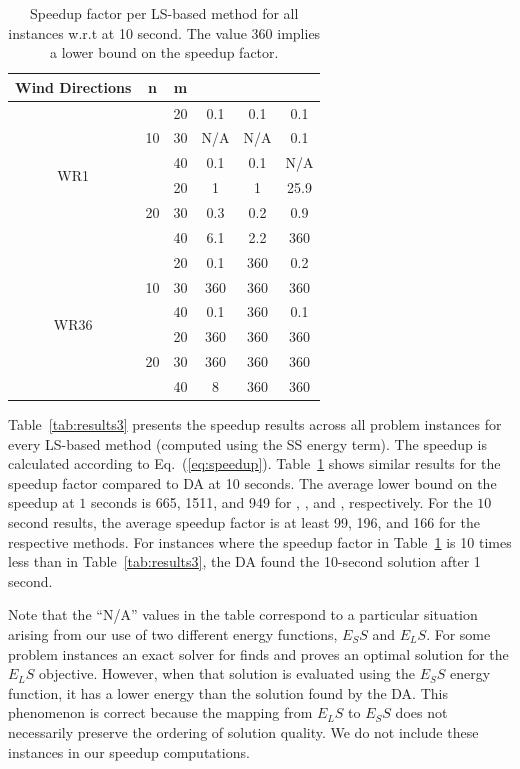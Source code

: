 \documentclass[preprint,12pt]{elsarticle}
\newcommand{\qcls}{{\sf {\small QC-LS\xspace}}}
\newcommand{\ilpls}{{\sf {\small ILP-LS\xspace}}}
\newcommand{\qclsgrb}{{\sf {\small QC-LS(GRB)\xspace}}}
\newcommand{\ilplsgrb}{{\sf {\small ILP-LS(GRB)\xspace}}}
\newcommand{\qulsgrb}{{\sf {\small QU-LS(GRB)\xspace}}}
\newcommand{\qulsda}{{\sf {\small QU-LS(DA)\xspace}}}
\begin{document}
\begin{table}[t!]
	\small
	\begin{tabular}{| c | c | c | c | c | c | }
		\toprule
		Wind Directions  & n  & m  & \qcls &  \ilpls & \qulsgrb  \\
		\toprule
		\multirow{6}{*}{WR1}  & \multirow{3}{*}{10}  & 20 & 0.1       & 0.1 & 0.1  \\
		& & 30   & N/A & N/A & 0.1     \\
		& & 40 & 0.1 & 0.1 & N/A                \\
		\cline{2-6}
		&\multirow{3}{*}{20}   & 20  & 1  & 1  & 25.9         \\
		&&30   & 0.3 & 0.2  & 0.9    \\
		&&40   & 6.1 & 2.2  & 360        \\
		\hline
		\multirow{6}{*}{WR36} &  \multirow{3}{*}{10}    & 20 & 0.1       & 360 & 0.2  \\
		&& 30  & 360 & 360 & 360                     \\
		&&40   & 0.1 & 360 & 0.1          \\
		\cline{2-6}
		&  \multirow{3}{*}{20}   & 20   & 360  & 360 & 360            \\
		&&30   &  360  & 360 & 360                    \\
		&&40   &  8  & 360 & 360 \\
		
		\bottomrule                   
	\end{tabular}
	
	\vspace{0.5em}
	\caption{Speedup factor per LS-based method for all instances w.r.t \qulsda{} at 10 second. The value 360 implies a lower bound on the speedup factor.}\label{tab:results4}
\end{table}
Table~\ref{tab:results3} presents the speedup results across all problem instances
for every LS-based method (computed using the SS energy term). The speedup is calculated according to Eq.~(\ref{eq:speedup}). Table~\ref{tab:results4} shows similar results for the speedup factor
compared to DA at 10 seconds. The average lower bound on the speedup at $1$ seconds
is 665,	1511, and 949 for \qclsgrb, \qulsgrb, and \ilplsgrb, respectively. For the $10$ second
results, the average
speedup factor is at least 99, 196, and	166 for the respective methods.
For instances where the speedup factor in Table~\ref{tab:results4} is 10 times less than in Table~\ref{tab:results3},
the DA found the 10-second solution after 1 second.

Note that the ``N/A'' values in the table correspond to a particular situation arising from our use of two different energy functions, $E_SS$ and $E_LS$. For some problem instances an exact solver for \qcls{} finds and proves an optimal solution for the $E_LS$ objective. However, when that solution is evaluated using the $E_SS$ energy function, it has a lower energy than the solution found by the DA. This phenomenon is correct because the mapping from $E_LS$ to $E_SS$ does not necessarily preserve the ordering of solution quality. We do not include these instances in our speedup computations.  
\end{document}
